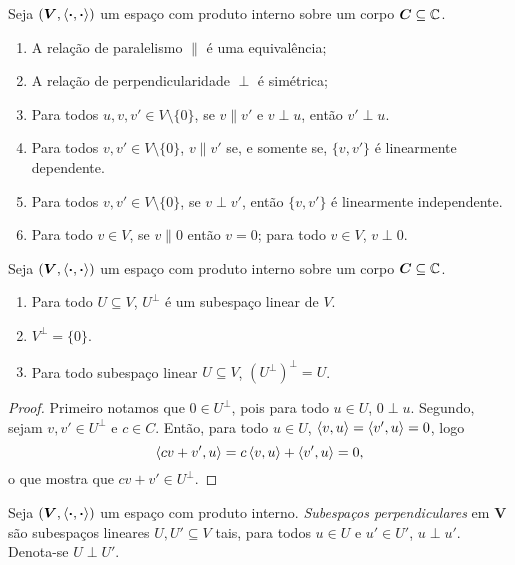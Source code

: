 \begin{proposition}
Seja $(\bm V,\left\langle{\bm{\cdot}},{\bm{\cdot}}\right\rangle)$ um espaço com produto interno sobre um corpo $\bm C \subseteq \mathbb{C}$.
	\begin{enumerate}
	\item A relação de paralelismo $\parallel$ é uma equivalência;
	\item A relação de perpendicularidade $\perp$ é simétrica;
	\item Para todos $u,v,v' \in V \setminus \{0\}$, se $v \parallel v'$ e $v \perp u$, então $v' \perp u$.
	\item Para todos $v,v' \in V \setminus \{0\}$, $v \parallel v'$ se, e somente se, $\{v,v'\}$ é linearmente dependente.
	\item Para todos $v,v' \in V \setminus \{0\}$, se $v \perp v'$, então $\{v,v'\}$ é linearmente independente.
	\item Para todo $v \in V$, se $v \parallel 0$ então $v=0$; para todo $v \in V$, $v \perp 0$.
	\end{enumerate}
\end{proposition}

\begin{proposition}
Seja $(\bm V,\left\langle{\bm{\cdot}},{\bm{\cdot}}\right\rangle)$ um espaço com produto interno sobre um corpo $\bm C \subseteq \mathbb{C}$.
	\begin{enumerate}
	\item Para todo $U \subseteq V$, $U^\perp$ é um subespaço linear de $V$.
	\item $V^\perp = \{0\}$.
	\item Para todo subespaço linear $U \subseteq V$, $(U^\perp)^\perp = U$.
	\end{enumerate}
\end{proposition}
\begin{proof}
Primeiro notamos que $0 \in U^\perp$, pois para todo $u \in U$, $0 \perp u$. Segundo, sejam $v,v' \in U^\perp$ e $c \in C$. Então, para todo $u \in U$, $\left\langle{v},{u}\right\rangle = \left\langle{v'},{u}\right\rangle = 0$, logo
	\begin{equation*}
	\left\langle{cv+v'},{u}\right\rangle = c\left\langle{v},{u}\right\rangle + \left\langle{v'},{u}\right\rangle = 0,
	\end{equation*}
o que mostra que $cv+v' \in U^\perp$.
\end{proof}

\begin{definition}
Seja $(\bm V,\left\langle{\bm{\cdot}},{\bm{\cdot}}\right\rangle)$ um espaço com produto interno. \emph{Subespaços perpendiculares} em $\bm V$ são subespaços lineares $U,U' \subseteq V$ tais, para todos $u \in U$ e $u' \in U'$, $u \perp u'$. Denota-se $U \perp U'$.
\end{definition}

